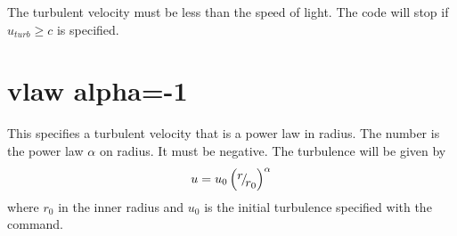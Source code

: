 The turbulent velocity must be less than the speed of light.
The code will stop if $u_{turb} \geq c$ is specified.

\section{vlaw alpha=-1}

This specifies a turbulent velocity that is a power law in radius.
The number is the power law $\alpha$ on radius.
It must be negative.
The turbulence will be given by
\begin{equation}
u = u_0 \left( {{\raise0.7ex\hbox{$r$} \!\mathord{\left/
 {\vphantom {r {r_0 }}}\right.\kern-\nulldelimiterspace}
\!\lower0.7ex\hbox{${r_0 }$}}} \right)^\alpha
\end{equation}
where $r_0$ in the inner radius and
$u_0$ is the initial turbulence specified with the
 command.
